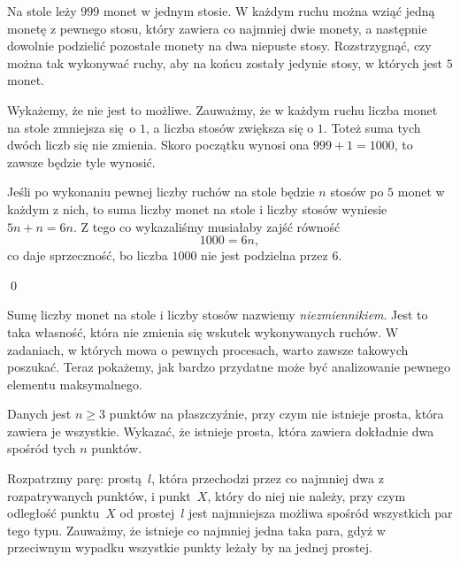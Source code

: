 



\noindent
Na stole leży $999$ monet w jednym stosie. W każdym ruchu można wziąć jedną monetę z pewnego stosu, który zawiera co najmniej dwie monety, a następnie dowolnie podzielić pozostałe monety na dwa niepuste stosy. Rozstrzygnąć, czy można tak wykonywać ruchy, aby na końcu zostały jedynie stosy, w których jest $5$ monet.

\vspace{5px}

\noindent
Wykażemy, że nie jest to możliwe. Zauważmy, że w każdym ruchu liczba monet na stole zmniejsza się o $1$, a liczba stosów zwiększa się o $1$. Toteż suma tych dwóch liczb się nie zmienia. Skoro początku wynosi ona $999 + 1 = 1000$, to zawsze będzie tyle wynosić.

\vspace{10px}
\noindent
Jeśli po wykonaniu pewnej liczby ruchów na stole będzie $n$ stosów po $5$ monet w każdym z nich, to suma liczby monet na stole i liczby stosów wyniesie $5n + n = 6n$. Z tego co wykazaliśmy musiałaby zajść równość
\[
	1000 = 6n,
\]
co daje sprzeczność, bo liczba $1000$ nie jest podzielna przez $6$.

\qed

\noindent
Sumę liczby monet na stole i liczby stosów nazwiemy \textit{niezmiennikiem}. Jest to taka własność, która nie zmienia się wskutek wykonywanych ruchów. W zadaniach, w których mowa o pewnych procesach, warto zawsze takowych poszukać. Teraz pokażemy, jak bardzo przydatne może być analizowanie pewnego elementu maksymalnego.

\vspace{10px}


\noindent
Danych jest $n \geqslant 3$ punktów na płaszczyźnie, przy czym nie istnieje prosta, która zawiera je wszystkie. Wykazać, że istnieje prosta, która zawiera dokładnie dwa spośród tych $n$ punktów.

\vspace{5px}

\noindent
Rozpatrzmy parę: prostą~$l$, która przechodzi przez co najmniej dwa z rozpatrywanych punktów, i punkt~$X$, który do niej nie należy, przy czym odległość punktu~$X$ od prostej~$l$ jest najmniejsza możliwa spośród wszystkich par tego typu. Zauważmy, że istnieje co najmniej jedna taka para, gdyż w przeciwnym wypadku wszystkie punkty leżały by na jednej prostej. 

